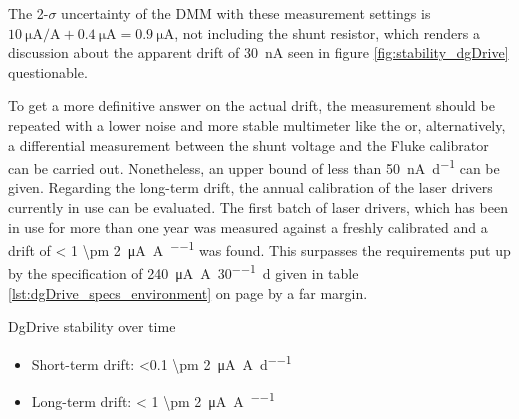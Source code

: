 The 2-$\sigma$ uncertainty of the  DMM \cite{datasheet_keysight34470A} with these measurement settings is $\qty{10}{\uA \per \A} + \qty{0.4}{\uA} = \qty{0.9}{\uA}$, not including the shunt resistor, which renders a discussion about the apparent drift of \qty{30}{\nA} seen in figure \ref{fig:stability_dgDrive} questionable.

To get a more definitive answer on the actual drift, the measurement should be repeated with a lower noise and more stable multimeter like the  or, alternatively, a differential measurement between the shunt voltage and the Fluke  calibrator can be carried out. Nonetheless, an upper bound of less than \qty{50}{\nA \per \day} can be given. Regarding the long-term drift, the annual calibration of the laser drivers currently in use can be evaluated. The first batch of laser drivers, which has been in use for more than one year was measured against a freshly calibrated  and a drift of \qty{< 1 \pm 2}{\uA \per \A \per \year} was found. This surpasses the requirements put up by the specification of \qty{240}{\uA \per \A \per 30 \day} given in table \ref{lst:dgDrive_specs_environment} on page \pageref{lst:dgDrive_specs_environment} by a far margin.
\begin{center}
    \begin{deviceProperties}[label={lst:dgDrive_temporal_stability}]{DgDrive stability over time}
    \begin{itemize}
        \item Short-term drift: \qty[per-mode = symbol]{<0.1 \pm 2}{\uA \per \A \per \day}
        \item Long-term drift: \qty[per-mode = symbol]{< 1 \pm 2}{\uA \per \A \per \year}
    \end{itemize}
    \end{deviceProperties}
\end{center}

